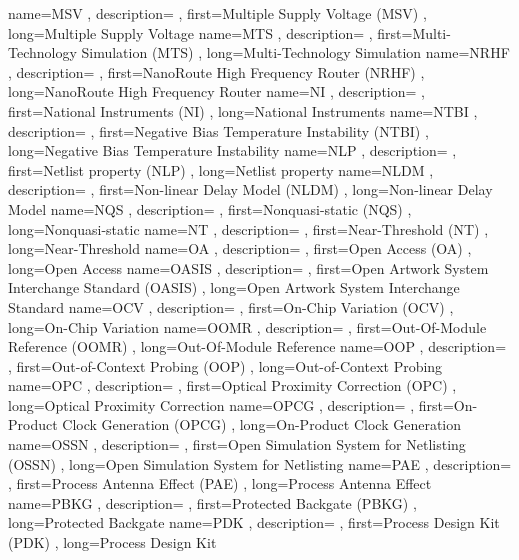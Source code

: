 { name={MSV}
, description={}
, first={Multiple Supply Voltage (MSV)}
, long={Multiple Supply Voltage}
}
{ name={MTS}
, description={}
, first={Multi-Technology Simulation (MTS)}
, long={Multi-Technology Simulation}
}
{ name={NRHF}
, description={}
, first={NanoRoute High Frequency Router (NRHF)}
, long={NanoRoute High Frequency Router}
}
{ name={NI}
, description={}
, first={National Instruments (NI)}
, long={National Instruments}
}
{ name={NTBI}
, description={}
, first={Negative Bias Temperature Instability (NTBI)}
, long={Negative Bias Temperature Instability}
}
{ name={NLP}
, description={}
, first={Netlist property (NLP)}
, long={Netlist property}
}
{ name={NLDM}
, description={}
, first={Non-linear Delay Model (NLDM)}
, long={Non-linear Delay Model}
}
{ name={NQS}
, description={}
, first={Nonquasi-static (NQS)}
, long={Nonquasi-static}
}
{ name={NT}
, description={}
, first={Near-Threshold (NT)}
, long={Near-Threshold}
}
{ name={OA}
, description={}
, first={Open Access (OA)}
, long={Open Access}
}
{ name={OASIS}
, description={}
, first={Open Artwork System Interchange Standard (OASIS)}
, long={Open Artwork System Interchange Standard}
}
{ name={OCV}
, description={}
, first={On-Chip Variation (OCV)}
, long={On-Chip Variation}
}
{ name={OOMR}
, description={}
, first={Out-Of-Module Reference (OOMR)}
, long={Out-Of-Module Reference}
}
{ name={OOP}
, description={}
, first={Out-of-Context Probing (OOP)}
, long={Out-of-Context Probing}
}
{ name={OPC}
, description={}
, first={Optical Proximity Correction (OPC)}
, long={Optical Proximity Correction}
}
{ name={OPCG}
, description={}
, first={On-Product Clock Generation (OPCG)}
, long={On-Product Clock Generation}
}
{ name={OSSN}
, description={}
, first={Open Simulation System for Netlisting (OSSN)}
, long={Open Simulation System for Netlisting}
}
{ name={PAE}
, description={}
, first={Process Antenna Effect (PAE)}
, long={Process Antenna Effect}
}
{ name={PBKG}
, description={}
, first={Protected Backgate (PBKG)}
, long={Protected Backgate}
}
{ name={PDK}
, description={}
, first={Process Design Kit (PDK)}
, long={Process Design Kit}
}
